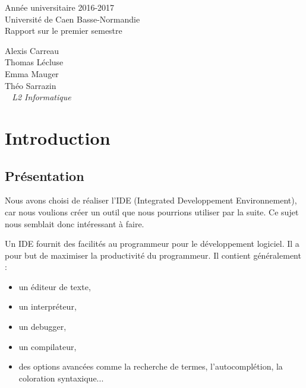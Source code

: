 \documentclass[a4paper,12pt]{article}
\begin{document}
\begin{titlepage}
	\begin{center}
		\Large{Année universitaire 2016-2017}\\
		\Large{Université de Caen Basse-Normandie}\\[1cm]
		
		\huge{Rapport sur le premier semestre}\\
		\vspace{3cm}
		
		Alexis Carreau\\
		Thomas Lécluse\\
		Emma Mauger\\
		Théo Sarrazin\\
		
	\normalsize{\textit{ ~ L2 Informatique}}\\
		\medskip
		\vspace{2cm}
		
	\end{center}
\end{titlepage}

\tableofcontents
\newpage

\section{Introduction}

	\subsection{Présentation}
	Nous avons choisi de réaliser l'IDE (Integrated Developpement Environnement), car nous voulions créer un outil que nous pourrions utiliser par la suite. Ce sujet nous semblait donc intéressant à faire.
	
	Un IDE fournit des facilités au programmeur pour le développement logiciel. Il a pour but de maximiser la productivité du programmeur. Il contient généralement :
	\begin{itemize}
		\item un éditeur de texte, 
		\item un interpréteur, 
		\item un debugger,
		\item un compilateur,
		\item des options avancées comme la recherche de termes, l'autocomplétion, la coloration syntaxique...
	\end{itemize}
	
\end{document}
